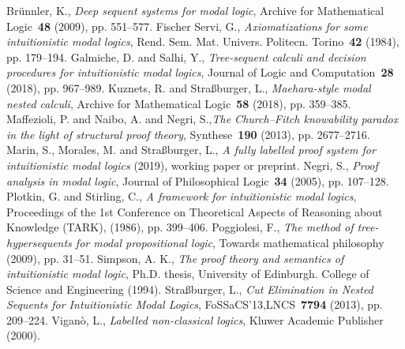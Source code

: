 \documentclass[twoside]{aiml20}
\begin{document}
\begin{thebibliography}{}
	Br{\"u}nnler, K., \emph{Deep sequent systems for modal logic}, Archive for Mathematical Logic~\textbf{48} (2009), pp. 551--577.
	Fischer Servi, G., \emph{Axiomatizations for some intuitionistic modal logics}, Rend. Sem. Mat. Univers. Politecn. Torino~\textbf{42} (1984), pp. 179--194.
	Galmiche, D. and Salhi, Y., \emph{Tree-sequent calculi and decision procedures for intuitionistic modal logics}, Journal of Logic and Computation~\textbf{28} (2018), pp. 967--989.
	 Kuznets, R. and Stra{\ss}burger, L., \emph{Maehara-style modal nested calculi}, Archive for Mathematical Logic~\textbf{58} (2018), pp. 359--385.
	 Maffezioli, P. and Naibo, A. and Negri, S.,\emph{The {C}hurch--{F}itch knowability paradox in the light of structural proof theory}, Synthese~\textbf{190} (2013), pp. 2677--2716.
	 Marin, S., Morales, M. and Stra{\ss}burger, L., \emph{A fully labelled proof system for intuitionistic modal logics} (2019), working paper or preprint.
	 Negri, S., \emph{Proof analysis in modal logic}, Journal of Philosophical Logic~\textbf{34} (2005), pp. 107--128.
	 Plotkin, G. and Stirling, C., \emph{A framework for intuitionistic modal logics}, Proceedings of the 1st Conference on Theoretical Aspects of Reasoning about Knowledge (TARK), (1986), pp. 399--406.
	 Poggiolesi, F., \emph{The method of tree-hypersequents for modal propositional logic}, Towards mathematical philosophy (2009), pp. 31--51.
	 Simpson, A. K., \emph{The proof theory and semantics of intuitionistic modal logic}, Ph.D. thesis, University of Edinburgh. College of Science and Engineering (1994).
	 Stra{\ss}burger, L., \emph{Cut Elimination in Nested Sequents for Intuitionistic Modal Logics}, FoSSaCS'13,LNCS~\textbf{7794} (2013), pp. 209--224.
	Vigan\`o, L., \emph{Labelled non-classical logics}, Kluwer Academic Publisher (2000).
\end{thebibliography}
\end{document}
